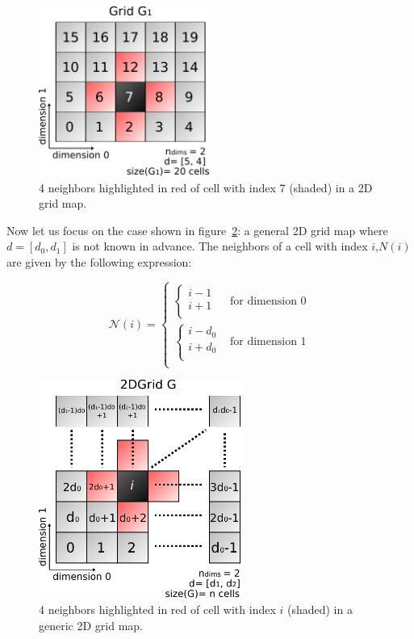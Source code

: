 \documentclass[12pt]{article}
\begin{document}
\begin{figure}[ht]
    \centering
    \includegraphics[width=0.5\textwidth]{2d_neighbors}
    \caption{4 neighbors highlighted in red of cell with index 7 (shaded) in a 2D grid map.}
    \label{fig:2d_neighbors}
\end{figure}

Now let us focus on the case shown in figure~\ref{fig:2d_grid}: a general 2D grid map where $d=[d_0,d_1]$ is not known in advance. The neighbors of a cell with index $i$,$N(i)$ are given by the following expression:

\begin{equation}
  \mathcal{N}(i) =
  \begin{cases}
      \begin{cases}
      i-1\\
      i+1\\
    \end{cases} & \text{for dimension 0}\\
     \begin{cases}
      i-d_0\\
      i+d_0\\
    \end{cases} & \text{for dimension 1}\\
  \end{cases}
  \label{eq:2d_neighbors}
\end{equation}


\begin{figure}[ht]
    \centering
    \includegraphics[width=0.6\textwidth]{2d_grid}
    \caption{4 neighbors highlighted in red of cell with index $i$ (shaded) in a generic 2D grid map.}
    \label{fig:2d_grid}
\end{figure}
\end{document}
